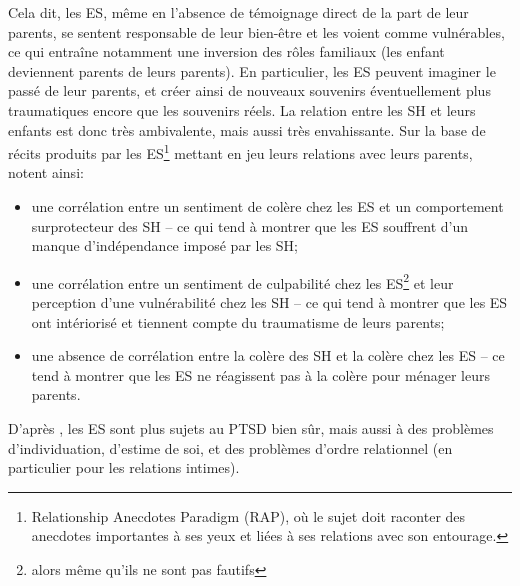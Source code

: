 \documentclass[french]{article}
\begin{document}
			Cela dit, les ES, même en l'absence de témoignage direct de la part de leur parents, se sentent responsable de leur bien-être et les voient comme vulnérables, ce qui entraîne notamment une inversion des rôles familiaux (les enfant deviennent parents de leurs parents). En particulier, les ES peuvent imaginer le passé de leur parents, et créer ainsi de nouveaux souvenirs éventuellement plus traumatiques encore que les souvenirs réels. La relation entre les SH et leurs enfants est donc très ambivalente, mais aussi très envahissante. Sur la base de récits produits par les ES\footnote{Relationship Anecdotes Paradigm (RAP), où le sujet doit raconter des anecdotes importantes à ses yeux et liées à ses relations avec son entourage.} mettant en jeu leurs relations avec leurs parents, \cite{wiseman2006} notent ainsi:
			\begin{itemize}
				\item une corrélation entre un sentiment de colère chez les ES et un comportement surprotecteur des SH -- ce qui tend à montrer que les ES souffrent d'un manque d'indépendance imposé par les SH;
				\item une corrélation entre un sentiment de culpabilité chez les ES\footnote{alors même qu'ils ne sont pas fautifs} et leur perception d'une vulnérabilité chez les SH -- ce qui tend à montrer que les ES ont intériorisé et tiennent compte du traumatisme de leurs parents;
				\item une absence de corrélation entre la colère des SH et la colère chez les ES -- ce tend à montrer que les ES ne réagissent pas à la colère pour ménager leurs parents.
			\end{itemize}\vspace{3mm}
			D'après \cite{fossion2003}, les ES sont plus sujets au PTSD bien sûr, mais aussi à des problèmes d'individuation, d'estime de soi, et des problèmes d'ordre relationnel (en particulier pour les relations intimes).\\
			
\end{document}
